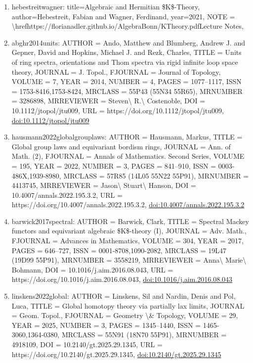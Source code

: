 \documentclass[11pt]{article}
\begin{document}
\begin{enumerate}[leftmargin=*]
  \item hebestreitwagner: title=Algebraic and Hermitian \$K\$-Theory, author=Hebestreit, Fabian and Wagner, Ferdinand, year=2021, NOTE = \textbackslash{}hrefhttps://florianadler.github.io/AlgebraBonn/KTheory.pdfLecture Notes,
  \item abghr2014units: AUTHOR = Ando, Matthew and Blumberg, Andrew J. and Gepner, David and Hopkins, Michael J. and Rezk, Charles, TITLE = Units of ring spectra, orientations and Thom spectra via rigid infinite loop space theory, JOURNAL = J. Topol., FJOURNAL = Journal of Topology, VOLUME = 7, YEAR = 2014, NUMBER = 4, PAGES = 1077--1117, ISSN = 1753-8416,1753-8424, MRCLASS = 55P43 (55N34 55R65), MRNUMBER = 3286898, MRREVIEWER = Steven\textbackslash{} R.\textbackslash{} Costenoble, DOI = 10.1112/jtopol/jtu009, URL = https://doi.org/10.1112/jtopol/jtu009, \href{https://doi.org/10.1112/jtopol/jtu009}{doi:10.1112/jtopol/jtu009}
  \item hausmann2022globalgrouplaws: AUTHOR = Hausmann, Markus, TITLE = Global group laws and equivariant bordism rings, JOURNAL = Ann. of Math. (2), FJOURNAL = Annals of Mathematics. Second Series, VOLUME = 195, YEAR = 2022, NUMBER = 3, PAGES = 841--910, ISSN = 0003-486X,1939-8980, MRCLASS = 57R85 (14L05 55N22 55P91), MRNUMBER = 4413745, MRREVIEWER = Jason\textbackslash{} Stuart\textbackslash{} Hanson, DOI = 10.4007/annals.2022.195.3.2, URL = https://doi.org/10.4007/annals.2022.195.3.2, \href{https://doi.org/10.4007/annals.2022.195.3.2}{doi:10.4007/annals.2022.195.3.2}
  \item barwick2017spectral: AUTHOR = Barwick, Clark, TITLE = Spectral Mackey functors and equivariant algebraic \$K\$-theory (I), JOURNAL = Adv. Math., FJOURNAL = Advances in Mathematics, VOLUME = 304, YEAR = 2017, PAGES = 646--727, ISSN = 0001-8708,1090-2082, MRCLASS = 19L47 (19D99 55P91), MRNUMBER = 3558219, MRREVIEWER = Anna\textbackslash{} Marie\textbackslash{} Bohmann, DOI = 10.1016/j.aim.2016.08.043, URL = https://doi.org/10.1016/j.aim.2016.08.043, \href{https://doi.org/10.1016/j.aim.2016.08.043}{doi:10.1016/j.aim.2016.08.043}
  \item linskens2022global: AUTHOR = Linskens, Sil and Nardin, Denis and Pol, Luca, TITLE = Global homotopy theory via partially lax limits, JOURNAL = Geom. Topol., FJOURNAL = Geometry \textbackslash{}\& Topology, VOLUME = 29, YEAR = 2025, NUMBER = 3, PAGES = 1345--1440, ISSN = 1465-3060,1364-0380, MRCLASS = 55N91 (18N70 55P91), MRNUMBER = 4918109, DOI = 10.2140/gt.2025.29.1345, URL = https://doi.org/10.2140/gt.2025.29.1345, \href{https://doi.org/10.2140/gt.2025.29.1345}{doi:10.2140/gt.2025.29.1345}

\end{enumerate}
\end{document}

